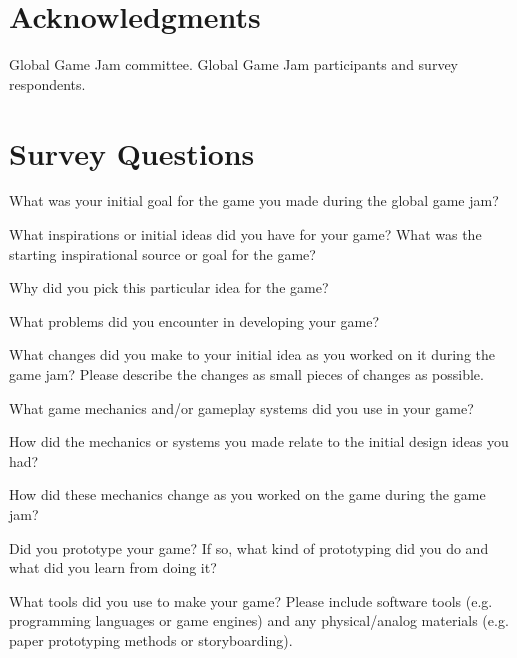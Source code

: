\documentclass{sig-alternate}
\begin{document}
\section{Acknowledgments}
Global Game Jam committee. Global Game Jam participants and survey respondents.







\pagebreak

\appendix
\section{Survey Questions}
\label{sec:survey}
\begin{list}{}{\leftmargin=10pt \itemindent=0em \itemsep=0pt}
\item What was your initial goal for the game you made during the global game jam?
\item What inspirations or initial ideas did you have for your game? What was the starting inspirational source or goal for the game?
\item Why did you pick this particular idea for the game?
\item What problems did you encounter in developing your game?
\item What changes did you make to your initial idea as you worked on it during the game jam? Please describe the changes as small pieces of changes as possible.
\item What game mechanics and/or gameplay systems did you use in your game?
\item How did the mechanics or systems you made relate to the initial design ideas you had?
\item How did these mechanics change as you worked on the game during the game jam?
\item Did you prototype your game? If so, what kind of prototyping did you do and what did you learn from doing it?
\item What tools did you use to make your game? Please include software tools (e.g. programming languages or game engines) and any physical/analog materials (e.g. paper prototyping methods or storyboarding).
\end{list}
\end{document}
